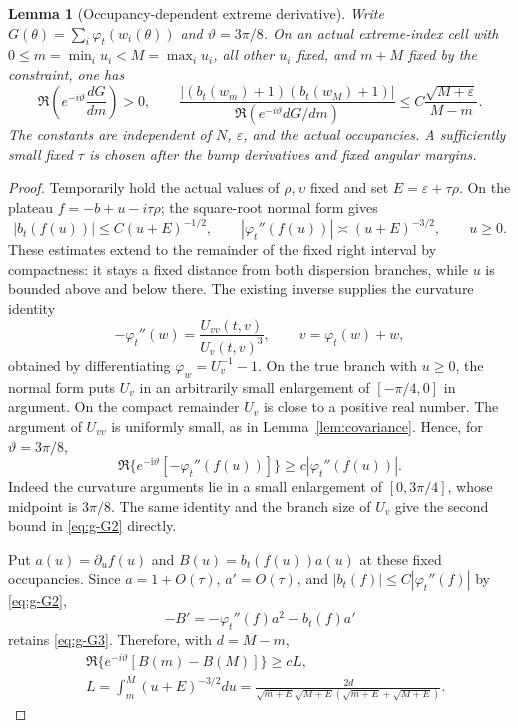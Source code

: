 \documentclass[11pt]{article}
\numberwithin{equation}{section}
\newtheorem{lemma}[theorem]{Lemma}
\theoremstyle{remark}\newtheorem{remark}[theorem]{Remark}
\newcommand{\ii}{\mathrm i}
\begin{document}
\begin{lemma}[Occupancy-dependent extreme derivative]\label{lem:global-coarea}
Write
$G(\theta)=\sum_i\varphi_t(w_i(\theta))$ and
$\vartheta=3\pi/8$.  On an actual extreme-index cell with
$0\le m=\min_i u_i<M=\max_i u_i$, all other $u_i$ fixed,
and $m+M$ fixed by the constraint, one has
\begin{equation}\label{eq:g-G1}
\Re\left(e^{-i\vartheta}\frac{dG}{dm}\right)>0,
 \qquad
 \frac{|(b_t(w_m)+1)(b_t(w_M)+1)|}
 {\Re(e^{-i\vartheta}dG/dm)}
 \le C\frac{\sqrt{M+\varepsilon}}{M-m}.
\end{equation}
The constants are independent of $N$, $\varepsilon$, and the
actual occupancies.  A sufficiently small fixed $\tau$ is chosen
after the bump derivatives and fixed angular margins.
\end{lemma}
\begin{proof}
Temporarily hold the actual values of $\rho,\upsilon$ fixed
and set $E=\varepsilon+\tau\rho$.
On the plateau $f=-b+u-i\tau\rho$; the square-root normal form gives
\begin{equation}\label{eq:g-G2}
|b_t(f(u))|\le C(u+E)^{-1/2},\qquad
 |\varphi_t''(f(u))|\asymp(u+E)^{-3/2},\qquad u\ge0.
\end{equation}
These estimates extend to the remainder of the fixed right
interval by compactness: it stays a fixed distance from both
dispersion branches, while $u$ is bounded above and below there.
The existing inverse supplies the curvature identity
\[
 -\varphi_t''(w)=\frac{U_{vv}(t,v)}{U_v(t,v)^3},
 \qquad v=\varphi_t(w)+w,
\]
obtained by differentiating $\varphi_w=U_v^{-1}-1$.
On the true branch with $u\ge0$, the normal form puts $U_v$
in an arbitrarily small enlargement of $[-\pi/4,0]$ in argument.
On the compact remainder $U_v$ is close to a positive real number.
The argument of $U_{vv}$ is uniformly small, as in
Lemma~\ref{lem:covariance}. Hence, for $\vartheta=3\pi/8$,
\begin{equation}\label{eq:g-G3}
 \Re\{e^{-\ii\vartheta}[-\varphi_t''(f(u))]\}
       \ge c|\varphi_t''(f(u))|.
\end{equation}
Indeed the curvature arguments lie in a small enlargement of
$[0,3\pi/4]$, whose midpoint is $3\pi/8$.
The same identity and the branch size of $U_v$ give the
second bound in \eqref{eq:g-G2} directly.

Put $a(u)=\partial_u f(u)$ and $B(u)=b_t(f(u))a(u)$ at these
fixed occupancies.  Since $a=1+O(\tau)$,
$a'=O(\tau)$, and $|b_t(f)|\le C|\varphi_t''(f)|$ by \eqref{eq:g-G2},
\[
 -B'=-\varphi_t''(f)a^2-b_t(f)a'
\]
retains \eqref{eq:g-G3}.  Therefore, with $d=M-m$,
\begin{equation}\label{eq:g-G4}
\begin{aligned}
 &\Re\{e^{-i\vartheta}[B(m)-B(M)]\}\ge cL,\\
 &L=\int_m^M(u+E)^{-3/2}du
 =\frac{2d}{\sqrt{m+E}\sqrt{M+E}
 (\sqrt{m+E}+\sqrt{M+E})}.
\end{aligned}
\end{equation}


\end{proof}
\end{document}
